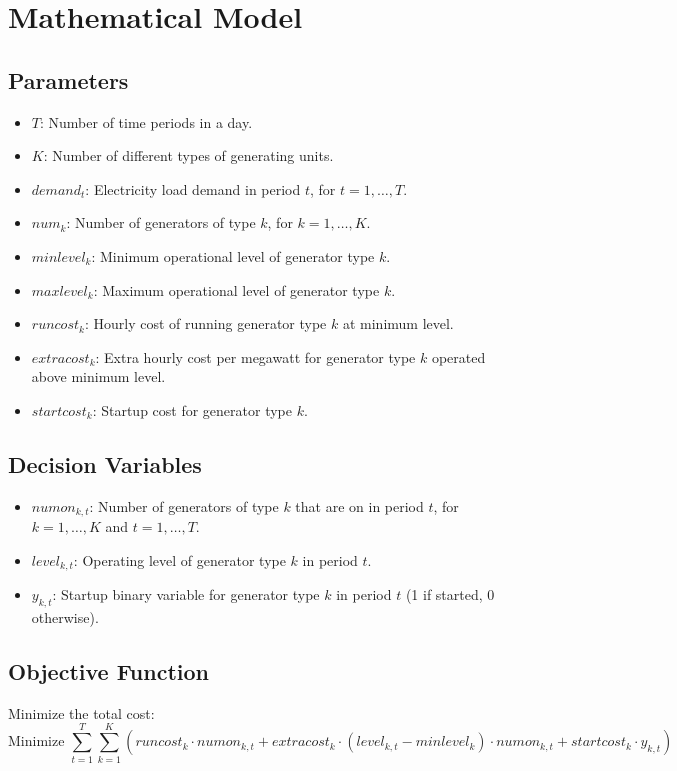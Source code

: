 \documentclass{article}
\begin{document}
\section*{Mathematical Model}

\subsection*{Parameters}
\begin{itemize}
    \item $T$: Number of time periods in a day.
    \item $K$: Number of different types of generating units.
    \item $demand_t$: Electricity load demand in period $t$, for $t = 1, \ldots, T$.
    \item $num_k$: Number of generators of type $k$, for $k = 1, \ldots, K$.
    \item $minlevel_k$: Minimum operational level of generator type $k$.
    \item $maxlevel_k$: Maximum operational level of generator type $k$.
    \item $runcost_k$: Hourly cost of running generator type $k$ at minimum level.
    \item $extracost_k$: Extra hourly cost per megawatt for generator type $k$ operated above minimum level.
    \item $startcost_k$: Startup cost for generator type $k$.
\end{itemize}

\subsection*{Decision Variables}
\begin{itemize}
    \item $numon_{k,t}$: Number of generators of type $k$ that are on in period $t$, for $k = 1, \ldots, K$ and $t = 1, \ldots, T$.
    \item $level_{k,t}$: Operating level of generator type $k$ in period $t$.
    \item $y_{k,t}$: Startup binary variable for generator type $k$ in period $t$ (1 if started, 0 otherwise).
\end{itemize}

\subsection*{Objective Function}
Minimize the total cost:
\[
\text{Minimize } \sum_{t=1}^{T} \sum_{k=1}^{K} \left( runcost_k \cdot numon_{k,t} + extracost_k \cdot (level_{k,t} - minlevel_k) \cdot numon_{k,t} + startcost_k \cdot y_{k,t} \right)
\]
\end{document}
